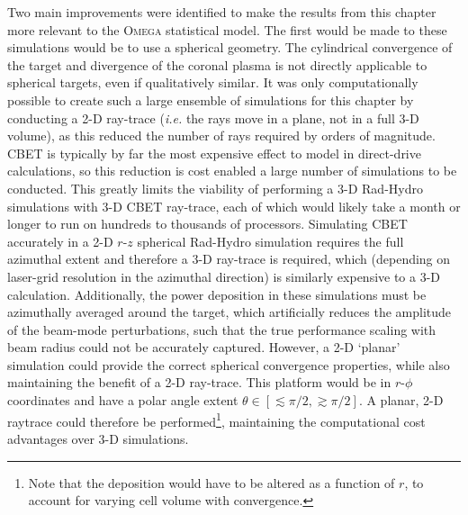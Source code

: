 Two main improvements were identified to make the results from this chapter more relevant to the \textsc{Omega} statistical model.
The first would be made to these simulations would be to use a spherical geometry.
The cylindrical convergence of the target and divergence of the coronal plasma is not directly applicable to spherical targets, even if qualitatively similar.
It was only computationally possible to create such a large ensemble of simulations for this chapter by conducting a 2-D ray-trace (\textit{i.e.} the rays move in a plane, not in a full 3-D volume), as this reduced the number of rays required by orders of magnitude.
\ac{CBET} is typically by far the most expensive effect to model in direct-drive calculations, so this reduction is cost enabled a large number of simulations to be conducted.
This greatly limits the viability of performing a 3-D \ac{Rad-Hydro} simulations with 3-D \ac{CBET} ray-trace, each of which would likely take a month or longer to run on hundreds to thousands of processors.
Simulating \ac{CBET} accurately in a 2-D $r$-$z$ spherical \ac{Rad-Hydro} simulation requires the full azimuthal extent and therefore a 3-D ray-trace is required, which (depending on laser-grid resolution in the azimuthal direction) is similarly expensive to a 3-D calculation.
Additionally, the power deposition in these simulations must be azimuthally averaged around the target, which artificially reduces the amplitude of the beam-mode perturbations, such that the true performance scaling with beam radius could not be accurately captured.
However, a 2-D `planar' simulation could provide the correct spherical convergence properties, while also maintaining the benefit of a 2-D ray-trace.
This platform would be in $r$-$\phi$ coordinates and have a polar angle extent $\theta \in [\lesssim\pi/2,\gtrsim\pi/2]$.
A planar, 2-D raytrace could therefore be performed\footnote{Note that the deposition would have to be altered as a function of $r$, to account for varying cell volume with convergence.}, maintaining the computational cost advantages over 3-D simulations.

